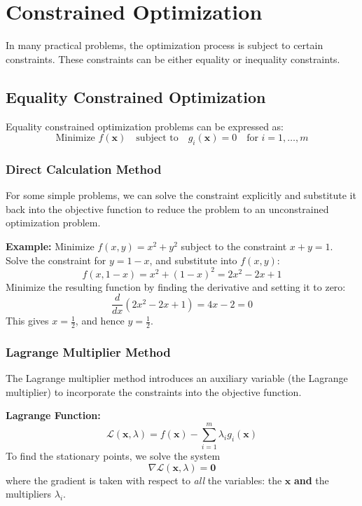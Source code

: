 \documentclass[]{article}
\begin{document}
	\section{Constrained Optimization}
	In many practical problems, the optimization process is subject to certain constraints.
	These constraints can be either equality or inequality constraints.
	
	\subsection{Equality Constrained Optimization}
	Equality constrained optimization problems can be expressed as:
	$$
	\text{Minimize } f(\mathbf{x})
	\quad
	\text{subject to}
	\quad
	g_i(\mathbf{x}) = 0
	\quad
	\text{for } i = 1, \dots, m
	$$
	
	\subsubsection{Direct Calculation Method}
	For some simple problems, we can solve the constraint explicitly and substitute it back into the objective function to reduce the problem to an unconstrained optimization problem.
	
	\vspace{1cm}
	\textbf{Example:}
	Minimize $f(x, y) = x^2 + y^2$ subject to the constraint $x + y = 1$.
	\\
	Solve the constraint for $y = 1 - x$, and substitute into $f(x, y)$:
	$$
	f(x, 1-x) = x^2 + (1-x)^2 = 2x^2 - 2x + 1
	$$
	Minimize the resulting function by finding the derivative and setting it to zero:
	$$
	\frac{d}{dx}(2x^2 - 2x + 1) = 4x - 2 = 0
	$$
	This gives $x = \frac{1}{2}$, and hence $y = \frac{1}{2}$.
	
	\subsubsection{Lagrange Multiplier Method}
	The Lagrange multiplier method introduces an auxiliary variable (the Lagrange multiplier) to incorporate the constraints into the objective function.
	
	\textbf{Lagrange Function:}
	$$
	\mathcal{L}(\mathbf{x}, \lambda) = f(\mathbf{x}) - \sum_{i=1}^m \lambda_i g_i(\mathbf{x})
	$$
	To find the stationary points, we solve the system
	$$
	\nabla \mathcal{L}(\mathbf{x}, \lambda) = \mathbf{0}
	$$
	where the gradient is taken with respect to \textit{all} the variables: the $\mathbf{x}$ \textbf{and} the multipliers $\lambda_i$.
\end{document}

